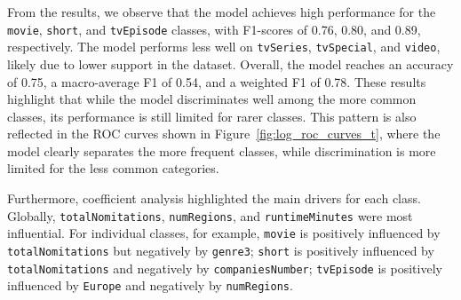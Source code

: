 From the results, we observe that the model achieves high performance for the 
\texttt{movie}, \texttt{short}, and \texttt{tvEpisode} classes, with F1-scores of 0.76, 
0.80, and 0.89, respectively. The model performs less well on \texttt{tvSeries}, 
\texttt{tvSpecial}, and \texttt{video}, likely due to lower support in the dataset.
Overall, the model reaches an accuracy of 0.75, 
a macro-average F1 of 0.54, and a weighted F1 of 0.78. These results highlight that 
while the model discriminates well among the more common classes, its performance is still
limited for rarer classes. 
This pattern is also reflected in the ROC curves shown in Figure~\ref{fig:log_roc_curves_t}, 
where the model clearly separates the more frequent classes, while discrimination is more limited 
for the less common categories.


Furthermore, coefficient analysis highlighted the main drivers for each class. Globally, \texttt{totalNomitations}, \texttt{numRegions}, and \texttt{runtimeMinutes} were most influential. 
For individual classes, for example, \texttt{movie} is positively influenced by \texttt{totalNomitations} but negatively by \texttt{genre3}; 
\texttt{short} is positively influenced by \texttt{totalNomitations} and negatively by \texttt{companiesNumber}; 
\texttt{tvEpisode} is positively influenced by \texttt{Europe} and negatively by \texttt{numRegions}.



